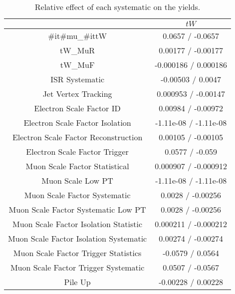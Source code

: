\documentclass[10pt]{article}
\begin{document}
\begin{table}[htbp]
\begin{center}
\begin{tabular}{|c|c|}
\hline 
      & $tW$ \\ 
\hline 
  #it{#mu}_{#it{tW}} & 0.0657 / -0.0657 \\ 
  tW_MuR & 0.00177 / -0.00177 \\ 
  tW_MuF & -0.000186 / 0.000186 \\ 
  ISR Systematic & -0.00503 / 0.0047 \\ 
  Jet Vertex Tracking & 0.000953 / -0.00147 \\ 
  Electron Scale Factor ID & 0.00984 / -0.00972 \\ 
  Electron Scale Factor Isolation & -1.11e-08 / -1.11e-08 \\ 
  Electron Scale Factor Reconstruction & 0.00105 / -0.00105 \\ 
  Electron Scale Factor Trigger & 0.0577 / -0.059 \\ 
  Muon Scale Factor Statistical & 0.000907 / -0.000912 \\ 
  Muon Scale Low PT & -1.11e-08 / -1.11e-08 \\ 
  Muon Scale Factor Systematic & 0.0028 / -0.00256 \\ 
  Muon Scale Factor Systematic Low PT & 0.0028 / -0.00256 \\ 
  Muon Scale Factor Isolation Statistic & 0.000211 / -0.000212 \\ 
  Muon Scale Factor Isolation Systematic & 0.00274 / -0.00274 \\ 
  Muon Scale Factor Trigger Statistics & -0.0579 / 0.0564 \\ 
  Muon Scale Factor Trigger Systematic & 0.0507 / -0.0567 \\ 
  Pile Up & -0.00228 / 0.00228 \\ 
\hline 
\end{tabular} 
\caption{Relative effect of each systematic on the yields.} 
\end{center} 
\end{table} 
\end{document}
